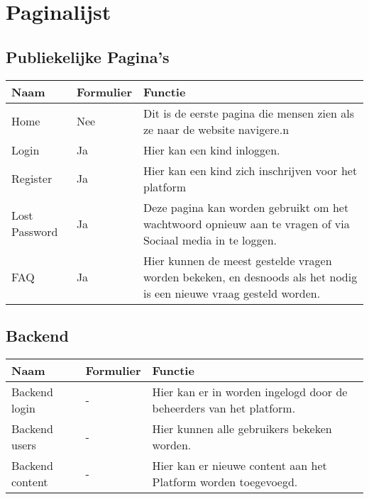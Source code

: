 \documentclass[]{report}
\begin{document}
\chapter{Paginalijst}

\section{Publiekelijke Pagina's}

\begin{tabular}{ l l p{6cm} }
	\textbf{Naam} & \textbf{Formulier} & \textbf{Functie} \\ \hline
	Home 				& Nee		& Dit is de eerste pagina die mensen zien als ze naar de website navigere.n \\ 
	Login 				& Ja		& Hier kan een kind inloggen. \\
	Register 			& Ja		& Hier kan een kind zich inschrijven voor het platform \\
	Lost Password		& Ja		& Deze pagina kan worden gebruikt om het wachtwoord opnieuw aan te vragen of via Sociaal media in te loggen. \\
	FAQ 				& Ja 		& Hier kunnen de meest gestelde vragen worden bekeken, en desnoods als het nodig is een nieuwe vraag gesteld worden. \\
\end{tabular}


\section{Backend}
\begin{tabular}{ p{4cm} l p{6cm} }
	\textbf{Naam} & \textbf{Formulier} & \textbf{Functie} \\ \hline
	Backend login	& -		& Hier kan er in worden ingelogd door de beheerders van het platform. \\
	Backend users	& - 	& Hier kunnen alle gebruikers bekeken worden. \\
	Backend content & - 	& Hier kan er nieuwe content aan het Platform worden toegevoegd. \\
\end{tabular}
\end{document}
